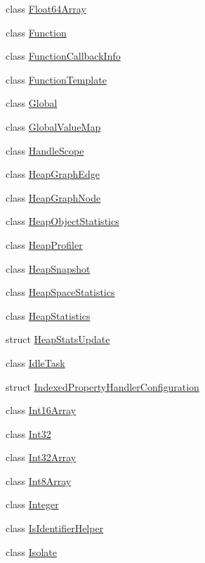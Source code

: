 \begin{DoxyCompactItemize}
\item 
class \hyperlink{classv8_1_1_float64_array}{Float64\+Array}
\item 
class \hyperlink{classv8_1_1_function}{Function}
\item 
class \hyperlink{classv8_1_1_function_callback_info}{Function\+Callback\+Info}
\item 
class \hyperlink{classv8_1_1_function_template}{Function\+Template}
\item 
class \hyperlink{classv8_1_1_global}{Global}
\item 
class \hyperlink{classv8_1_1_global_value_map}{Global\+Value\+Map}
\item 
class \hyperlink{classv8_1_1_handle_scope}{Handle\+Scope}
\item 
class \hyperlink{classv8_1_1_heap_graph_edge}{Heap\+Graph\+Edge}
\item 
class \hyperlink{classv8_1_1_heap_graph_node}{Heap\+Graph\+Node}
\item 
class \hyperlink{classv8_1_1_heap_object_statistics}{Heap\+Object\+Statistics}
\item 
class \hyperlink{classv8_1_1_heap_profiler}{Heap\+Profiler}
\item 
class \hyperlink{classv8_1_1_heap_snapshot}{Heap\+Snapshot}
\item 
class \hyperlink{classv8_1_1_heap_space_statistics}{Heap\+Space\+Statistics}
\item 
class \hyperlink{classv8_1_1_heap_statistics}{Heap\+Statistics}
\item 
struct \hyperlink{structv8_1_1_heap_stats_update}{Heap\+Stats\+Update}
\item 
class \hyperlink{classv8_1_1_idle_task}{Idle\+Task}
\item 
struct \hyperlink{structv8_1_1_indexed_property_handler_configuration}{Indexed\+Property\+Handler\+Configuration}
\item 
class \hyperlink{classv8_1_1_int16_array}{Int16\+Array}
\item 
class \hyperlink{classv8_1_1_int32}{Int32}
\item 
class \hyperlink{classv8_1_1_int32_array}{Int32\+Array}
\item 
class \hyperlink{classv8_1_1_int8_array}{Int8\+Array}
\item 
class \hyperlink{classv8_1_1_integer}{Integer}
\item 
class \hyperlink{classv8_1_1_is_identifier_helper}{Is\+Identifier\+Helper}
\item 
class \hyperlink{classv8_1_1_isolate}{Isolate}

\end{DoxyCompactItemize}
